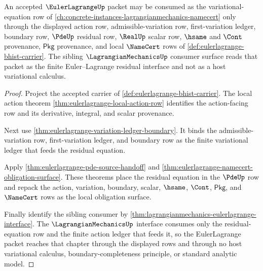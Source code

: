 \begin{theorem}
\label{thm:eulerlagrange-lagrangianmechanics-route}
An accepted $\EulerLagrangeUp$ packet may be consumed as the
variational-equation row of
\autoref{ch:concrete-instances-lagrangianmechanics-namecert} only through the
displayed action row, admissible-variation row, first-variation ledger,
boundary row, $\PdeUp$ residual row, $\RealUp$ scalar row, $\hsame$ and
$\Cont$ provenance, $\mathsf{Pkg}$ provenance, and local $\NameCert$ rows of
\autoref{def:eulerlagrange-bhist-carrier}. The sibling
$\LagrangianMechanicsUp$ consumer surface reads that packet as the finite
Euler--Lagrange residual interface and not as a host variational calculus.
\end{theorem}
\begin{proof}
Project the accepted carrier of \autoref{def:eulerlagrange-bhist-carrier}.
The local action theorem \autoref{thm:eulerlagrange-local-action-row}
identifies the action-facing row and its derivative, integral, and scalar
provenance.

Next use \autoref{thm:eulerlagrange-variation-ledger-boundary}. It binds the
admissible-variation row, first-variation ledger, and boundary row as the
finite variational ledger that feeds the residual equation.

Apply \autoref{thm:eulerlagrange-pde-source-handoff} and
\autoref{thm:eulerlagrange-namecert-obligation-surface}. These theorems place
the residual equation in the $\PdeUp$ row and repack the action, variation,
boundary, scalar, $\hsame$, $\Cont$, $\mathsf{Pkg}$, and $\NameCert$ rows as
the local obligation surface.

Finally identify the sibling consumer by
\autoref{thm:lagrangianmechanics-eulerlagrange-interface}. The
$\LagrangianMechanicsUp$ interface consumes only the residual-equation row and
the finite action ledger that feeds it, so the EulerLagrange packet reaches
that chapter through the displayed rows and through no host variational
calculus, boundary-completeness principle, or standard analytic model.
\end{proof}

